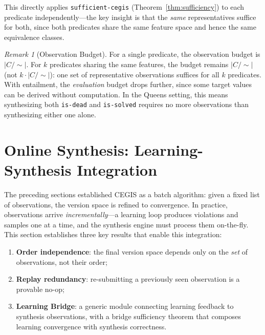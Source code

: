 \documentclass[9pt,a4paper]{article}
\theoremstyle{plain}
\theoremstyle{definition}
\theoremstyle{remark}
\newtheorem{remark}{Remark}
\begin{document}
\noindent This directly applies \texttt{sufficient-cegis} (Theorem~\ref{thm:sufficiency}) to each predicate independently---the key insight is that the \emph{same} representatives suffice for both, since both predicates share the same feature space and hence the same equivalence classes.

\begin{remark}[Observation Budget]
For a single predicate, the observation budget is $|C/{\sim}|$.  For $k$ predicates sharing the same features, the budget remains $|C/{\sim}|$ (not $k \cdot |C/{\sim}|$): one set of representative observations suffices for all $k$ predicates.  With entailment, the \emph{evaluation} budget drops further, since some target values can be derived without computation.  In the Queens setting, this means synthesizing both \texttt{is-dead} and \texttt{is-solved} requires no more observations than synthesizing either one alone.
\end{remark}



\section{Online Synthesis: Learning-Synthesis Integration}
\label{sec:online}

The preceding sections established CEGIS as a batch algorithm: given a fixed list of observations, the version space is refined to convergence.
In practice, observations arrive \emph{incrementally}---a learning loop produces violations and samples one at a time, and the synthesis engine must process them on-the-fly.
This section establishes three key results that enable this integration:
\begin{enumerate}
\item \textbf{Order independence}: the final version space depends only on the \emph{set} of observations, not their order;
\item \textbf{Replay redundancy}: re-submitting a previously seen observation is a provable no-op;
\item \textbf{Learning Bridge}: a generic module connecting learning feedback to synthesis observations, with a bridge sufficiency theorem that composes learning convergence with synthesis correctness.
\end{enumerate}
\end{document}
